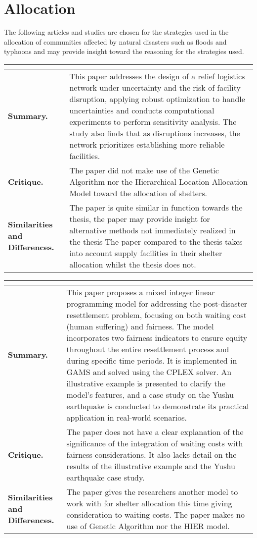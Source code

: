 \section{Allocation}

The following articles and studies are chosen for the strategies used in the allocation of communities affected by natural disasters such as floods and typhoons and may provide insight toward the reasoning for the strategies used.

\begin{longtable}{|L{.2\linewidth}|L{.74\linewidth}|}
	\hline
	\\ \hline
	\textbf{Summary.} & This paper addresses the design of a relief logistics network under uncertainty and the risk of facility disruption, applying robust optimization to handle uncertainties and conducts computational experiments to perform sensitivity analysis. The study also finds that as disruptions increases, the network prioritizes establishing more reliable facilities. \\ \hline
	\textbf{Critique.} & The paper did not make use of the Genetic Algorithm nor the Hierarchical Location Allocation Model toward the allocation of shelters. \\ \hline
	\textbf{Similarities and Differences.} & The paper is quite similar in function towards the thesis, the paper may provide insight for alternative methods not immediately realized in the thesis	The paper compared to the thesis takes into account supply facilities in their shelter allocation whilst the thesis does not.\\ \hline
\end{longtable}

\begin{longtable}{|L{.2\linewidth}|L{.74\linewidth}|}
	\hline
	\\ \hline
	\textbf{Summary.} & This paper proposes a mixed integer linear programming model for addressing the post-disaster resettlement problem, focusing on both waiting cost (human suffering) and fairness. The model incorporates two fairness indicators to ensure equity throughout the entire resettlement process and during specific time periods. It is implemented in GAMS and solved using the CPLEX solver. An illustrative example is presented to clarify the model's features, and a case study on the Yushu earthquake is conducted to demonstrate its practical application in real-world scenarios.\\ \hline
	\textbf{Critique.} & The paper does not have a clear explanation of the significance of the integration of waiting costs with fairness considerations. It also lacks detail on the results of the illustrative example and the Yushu earthquake case study.\\ \hline
	\textbf{Similarities and Differences.} & The paper gives the researchers another model to work with for shelter allocation this time giving consideration to waiting costs.	The paper makes no use of Genetic Algorithm nor the HIER model.\\ \hline
\end{longtable}

